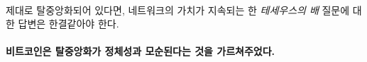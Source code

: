 \paragraph{}
제대로 탈중앙화되어 있다면, 네트워크의 가치가 지속되는 한 \textit{테세우스의 배} 질문에 대한 답변은 한결같아야 한다.

\paragraph{비트코인은 탈중앙화가 정체성과 모순된다는 것을 가르쳐주었다.}

%
%
%
%

